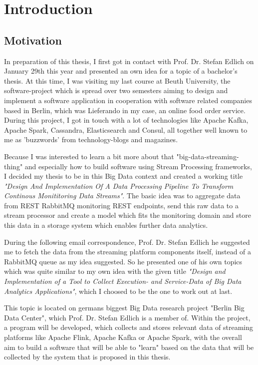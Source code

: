 \chapter{Introduction}
\section{Motivation}
In preparation of this thesis, I first got in contact with Prof. Dr. Stefan Edlich on January
29th this year and presented an own idea for a topic of a bachelor's thesis. At this time,
I was visiting my last course at Beuth University, the software-project which is spread
over two semesters aiming to design and implement a software application in cooperation
with software related companies based in Berlin, which was Lieferando in my case, an
online food order service. During this project, I got in touch with a lot of technologies
like Apache Kafka, Apache Spark, Cassandra, Elasticsearch and Consul, all together well
known to me as 'buzzwords' from technology-blogs and magazines.

Because I was interested to learn a bit more about that "big-data-streaming-thing" and
especially how to build software using Stream Processing frameworks, I decided my thesis
to be in this Big Data context and created a working title \textit{"Design And Implementation Of
A Data Processing Pipeline To Transform Continous Monititoring Data Streams"}. The
basic idea was to aggregate data from REST RabbitMQ monitoring REST endpoints, send this raw data
to a stream processor and create a model which fits the monitoring domain and store this
data in a storage system which enables further data analytics.

During the following email correspondence, Prof. Dr. Stefan Edlich he suggested me to
fetch the data from the streaming platform components itself, instead of a RabbitMQ
queue as my idea suggested. So he presented one of his own topics which was quite
similar to my own idea with the given title \textit{"Design and Implementation of a Tool to
Collect Execution- and Service-Data of Big Data Analytics Applications"}, which I choosed to
be the one to work out at last.

This topic is located on germans biggest Big Data research project "Berlin Big Data Center",
which Prof. Dr. Stefan Edlich is a member of. Within the project, a program will be
developed, which collects and stores relevant data of streaming platforms like Apache
Flink, Apache Kafka or Apache Spark, with the overall aim to build a software that will be
able to "learn" based on the data that will be collected by the system that is proposed in
this thesis.

